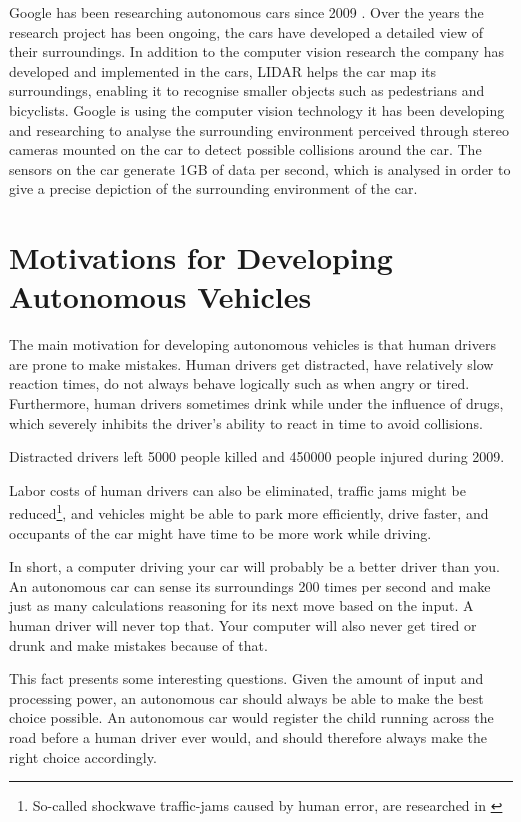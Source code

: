 Google has been researching autonomous cars since 2009 \cite{googlecars}. Over the years the research project has been ongoing, the cars have developed a detailed view of their surroundings. In addition to the computer vision research the company has developed and implemented in the cars, LIDAR helps the car map its surroundings, enabling it to recognise smaller objects such as pedestrians and bicyclists. Google is using the computer vision technology it has been developing and researching to analyse the surrounding environment perceived through stereo cameras mounted on the car to detect possible collisions around the car. The sensors on the car generate 1GB of data per second\cite{datagathering}, which is analysed in order to give a precise depiction of the surrounding environment of the car. 

\section{Motivations for Developing Autonomous Vehicles}
The main motivation for developing autonomous vehicles is that human drivers are prone to make mistakes. Human drivers get distracted, have relatively slow reaction times, do not always behave logically such as when angry or tired. Furthermore, human drivers sometimes drink while under the influence of drugs, which severely inhibits the driver's ability to react in time to avoid collisions. 

\newpar Distracted drivers left 5000 people killed and 450000 people injured during 2009. \cite{distracteddriving} 

Labor costs of human drivers can also be eliminated, traffic jams might be reduced\footnote{So-called shockwave traffic-jams caused by human error, are researched in \cite{1367-2630-10-3-033001}}, and vehicles might be able to park more efficiently, drive faster, and occupants of the car might have time to be more work while driving. 

\newpar In short, a computer driving your car will probably be a better driver than you. An autonomous car can sense its surroundings 200 times per second and make just as many calculations reasoning for its next move based on the input. A human driver will never top that. Your computer will also never get tired or drunk and make mistakes because of that. 

This fact presents some interesting questions. Given the amount of input and processing power, an autonomous car should always be able to make the best choice possible. An autonomous car would register the child running across the road before a human driver ever would, and should therefore always make the right choice accordingly. 

